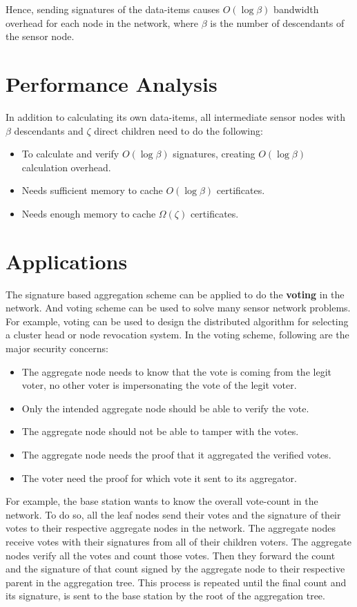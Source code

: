 	Hence, sending signatures of the data-items causes $O(\log \beta)$ bandwidth overhead for each node in the network, where $\beta$ is the number of descendants of the sensor node. 


\section{Performance Analysis}
	In addition to calculating its own data-items, all intermediate sensor nodes with $\beta$ descendants and $\zeta$ direct children need to do the following:
	\begin{itemize}
		\item To calculate and verify $O(\log \beta)$ signatures, creating $O(\log \beta)$ calculation overhead. 
		\item Needs sufficient memory to cache $O(\log \beta)$ certificates. 
		\item Needs enough memory to cache $\Omega(\zeta)$ certificates.
	\end{itemize}


\section{Applications}
		The signature based aggregation scheme can be applied to do the \textbf{voting} in the network.
		And voting scheme can be used to solve many sensor network problems.
		For example, voting can be used to design the distributed algorithm for selecting a cluster head or node revocation system.
		In the voting scheme, following are the major security concerns: 
		\begin{itemize}
			\item The aggregate node needs to know that the vote is coming from the legit voter, no other voter is impersonating the vote of the legit voter.
			\item Only the intended aggregate node should be able to verify the vote.
			\item The aggregate node should not be able to tamper with the votes. 
			\item The aggregate node needs the proof that it aggregated the verified votes.
			\item The voter need the proof for which vote it sent to its aggregator.
		\end{itemize}
		For example, the base station wants to know the overall vote-count in the network.
		To do so, all the leaf nodes send their votes and the signature of their votes to their respective aggregate nodes in the network.
		The aggregate nodes receive votes with their signatures from all of their children voters.
		The aggregate nodes verify all the votes and count those votes.
		Then they forward the count and the signature of that count signed by the aggregate node to their respective parent in the aggregation tree.
		This process is repeated until the final count and its signature, is sent to the base station by the root of the aggregation tree.
				
